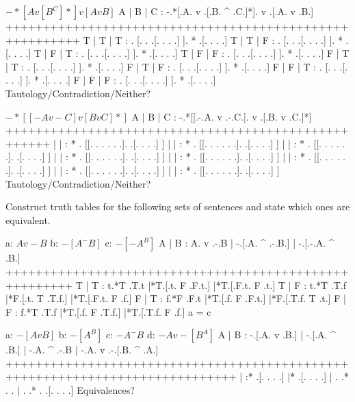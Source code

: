 $ -*[A v [B ^ C]*] v [A v B] $
        \answer
        \truthtable
         A | B | C : -.*[.A. v .[.B. ^ .C.]*].  v  .[.A. v .B.]
        ++++++++++++++++++++++++++++++++++++++++++++++++++++++++
         T | T | T :  . [. .   .[. .   . .] ]. *   .[. .   . .]
         T | T | F :  . [. .   .[. .   . .] ]. *   .[. .   . .]
         T | F | T :  . [. .   .[. .   . .] ]. *   .[. .   . .]
         T | F | F :  . [. .   .[. .   . .] ]. *   .[. .   . .]
         F | T | T :  . [. .   .[. .   . .] ]. *   .[. .   . .]
         F | T | F :  . [. .   .[. .   . .] ]. *   .[. .   . .]
         F | F | T :  . [. .   .[. .   . .] ]. *   .[. .   . .]
         F | F | F :  . [. .   .[. .   . .] ]. *   .[. .   . .]
        \endtruthtable
        Tautology/Contradiction/Neither?
        \endanswer

$ -*[[-A v -C] v [B v C]*] $
        \answer
        \truthtable
         A | B | C :  -.*[[.-.A. v .-.C.]. v .[.B. v .C.]*]
        ++++++++++++++++++++++++++++++++++++++++++++++++++++
           |   |   : * . [[. . .   . . .].   .[. .   . .] ]
           |   |   : * . [[. . .   . . .].   .[. .   . .] ]
           |   |   : * . [[. . .   . . .].   .[. .   . .] ]
           |   |   : * . [[. . .   . . .].   .[. .   . .] ]
           |   |   : * . [[. . .   . . .].   .[. .   . .] ]
           |   |   : * . [[. . .   . . .].   .[. .   . .] ]
           |   |   : * . [[. . .   . . .].   .[. .   . .] ]
           |   |   : * . [[. . .   . . .].   .[. .   . .] ]
        \endtruthtable
        Tautology/Contradiction/Neither?
        \endanswer

\endproblems

Construct truth tables for the following sets of sentences and state which ones are equivalent.

\problems
{}
\list
a: $ A v -B $
b: $ -[A ^ -B] $
c: $ -[-A ^ B] $
\endlist
        \answer
        \truthtable
         A | B : A. v .-.B | -.[.A. ^ .-.B.] | -.[.-.A. ^ .B.]
        +++++++++++++++++++++++++++++++++++++++++++++++++++++++
         T | T : t.*T .T.t |*T.[.t. F .F.t.] |*T.[.F.t. F .t.]
         T | F : t.*T .T.f |*F.[.t. T .T.f.] |*T.[.F.t. F .f.]
         F | T : f.*F .F.t |*T.[.f. F .F.t.] |*F.[.T.f. T .t.]
         F | F : f.*T .T.f |*T.[.f. F .T.f.] |*T.[.T.f. F .f.]
        \endtruthtable
        a = c
        \endanswer

\list
a: $ -[A v B] $
b: $ -[A ^ B] $
c: $ -A ^ -B $
d: $ -A v -[B ^ A] $
\endlist
        \answer
        \truthtable
         A | B : -.[.A. v .B.] | -.[.A. ^ .B.] | -.A. ^ .-.B | -.A. v .-.[.B. ^ .A.]
        +++++++++++++++++++++++++++++++++++++++++++++++++++++++++++++++++++++++++++++
           |   :* .[. .   . .] |* .[. .   . .] |  . .*  . .  |  . .*  . .[. .   . .]
        \endtruthtable
        Equivalences?
        \endanswer

